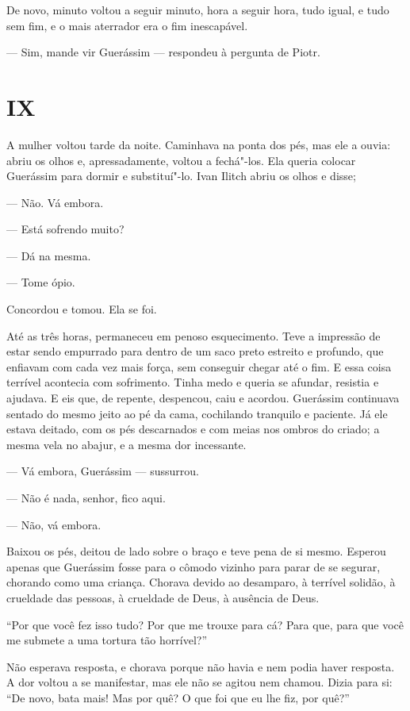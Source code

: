 De novo, minuto voltou a seguir minuto, hora a seguir hora, tudo igual,
e tudo sem fim, e o mais aterrador era o fim inescapável.

--- Sim, mande vir Guerássim --- respondeu à pergunta de Piotr.

\section*{IX}

A mulher voltou tarde da noite. Caminhava na ponta dos pés, mas ele a
ouvia: abriu os olhos e, apressadamente, voltou a fechá"-los. Ela queria
colocar Guerássim para dormir e substituí"-lo. Ivan Ilitch abriu os olhos
e disse;

--- Não. Vá embora.

--- Está sofrendo muito?

--- Dá na mesma.

--- Tome ópio.

Concordou e tomou. Ela se foi.

Até as três horas, permaneceu em penoso esquecimento. Teve a impressão
de estar sendo empurrado para dentro de um saco preto estreito e
profundo, que enfiavam com cada vez mais força, sem conseguir chegar até
o fim. E essa coisa terrível acontecia com sofrimento. Tinha medo e
queria se afundar, resistia e ajudava. E eis que, de repente, despencou,
caiu e acordou. Guerássim continuava sentado do mesmo jeito ao pé da
cama, cochilando tranquilo e paciente. Já ele estava deitado, com os pés
descarnados e com meias nos ombros do criado; a mesma vela no abajur, e
a mesma dor incessante.

--- Vá embora, Guerássim --- sussurrou.

--- Não é nada, senhor, fico aqui.

--- Não, vá embora.

Baixou os pés, deitou de lado sobre o braço e teve pena de si mesmo.
Esperou apenas que Guerássim fosse para o cômodo vizinho para parar de
se segurar, chorando como uma criança. Chorava devido ao desamparo, à
terrível solidão, à crueldade das pessoas, à crueldade de Deus, à
ausência de Deus.

``Por que você fez isso tudo? Por que me trouxe para cá? Para que, para
que você me submete a uma tortura tão horrível?''

Não esperava resposta, e chorava porque não havia e nem podia haver
resposta. A dor voltou a se manifestar, mas ele não se agitou nem
chamou. Dizia para si: ``De novo, bata mais! Mas por quê? O que foi que
eu lhe fiz, por quê?''

